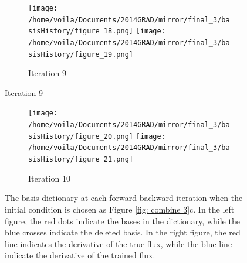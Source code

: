 \begin{figure}\ContinuedFloat
\begin{center}
    \begin{subfigure}[t]{1.\textwidth}
        \centering
        \texttt{[image: /home/voila/Documents/2014GRAD/mirror/final\_3/basisHistory/figure\_18.png]}
        \texttt{[image: /home/voila/Documents/2014GRAD/mirror/final\_3/basisHistory/figure\_19.png]}
        \caption{Iteration 9}
        \label{fig: basis history 9}
    \end{subfigure}   
\end{center}
\end{figure}
\begin{figure}\ContinuedFloat
\begin{center}
    \begin{subfigure}[t]{1.\textwidth}
        \centering
        \texttt{[image: /home/voila/Documents/2014GRAD/mirror/final\_3/basisHistory/figure\_20.png]}
        \texttt{[image: /home/voila/Documents/2014GRAD/mirror/final\_3/basisHistory/figure\_21.png]}
        \caption{Iteration 10}
        \label{fig: basis history 10}
    \end{subfigure}   
    \caption{The basis dictionary at each forward-backward iteration when the initial 
             condition is chosen as Figure \ref{fig: combine 3}c. 
             In the left figure, 
             the red dots indicate the bases in the dictionary, while 
             the blue crosses indicate the deleted
             basis. In the right figure, the red line indicates the derivative of the true flux,
             while the blue line indicate the derivative of the trained flux.}
    \label{fig: basis history}
\end{center}\end{figure}



